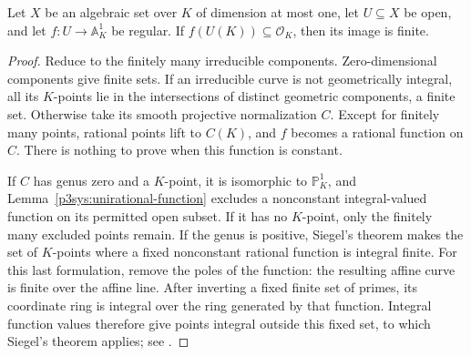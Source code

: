 \begin{lemma}\label{p3sys:curve-function}
Let $X$ be an algebraic set over $K$ of dimension at most one,
let $U\subseteq X$ be open, and let $f:U\to\mathbb A^1_K$ be
regular.  If $f(U(K))\subseteq\mathcal O_K$, then its image is
finite.
\end{lemma}
\begin{proof}
Reduce to the finitely many irreducible components.  Zero-dimensional
components give finite sets.  If an irreducible curve is not geometrically
integral, all its $K$-points lie in the intersections of distinct
geometric components, a finite set.  Otherwise take its smooth
projective normalization $C$.  Except for finitely many points, rational
points lift to $C(K)$, and $f$ becomes a rational function on $C$.
There is nothing to prove when this function is constant.

If $C$ has genus zero and a $K$-point, it is isomorphic to
$\mathbb P^1_K$, and Lemma~\ref{p3sys:unirational-function} excludes
a nonconstant integral-valued function on its permitted open subset.
If it has no $K$-point, only the finitely many excluded points remain.
If the genus is positive, Siegel's theorem makes the set of $K$-points
where a fixed nonconstant rational function is integral finite.
For this last formulation, remove the poles of the function: the
resulting affine curve is finite over the affine line.  After inverting
a fixed finite set of primes, its coordinate ring is integral over
the ring generated by that function.  Integral function values
therefore give points integral outside this fixed set, to which
Siegel's theorem applies; see \cite[Chapter~8]{lbLang1983}.
\end{proof}

